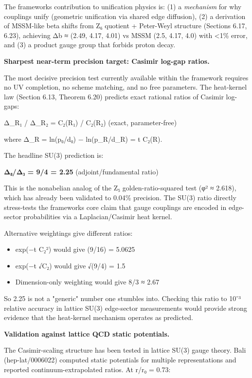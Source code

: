The framework\textquotesingle s contribution to unification physics is: (1) a \emph{mechanism} for why couplings unify (geometric unification via shared edge diffusion), (2) a derivation of MSSM-like beta shifts from Z₆ quotient + Peter-Weyl structure (Sections 6.17, 6.23), achieving Δb ≈ (2.49, 4.17, 4.01) vs MSSM (2.5, 4.17, 4.0) with \textless1\% error, and (3) a product gauge group that forbids proton decay.

\textbf{Sharpest near-term precision target: Casimir log-gap ratios.}

The most decisive precision test currently available within the framework requires no UV completion, no scheme matching, and no free parameters. The heat-kernel law (Section 6.13, Theorem 6.20) predicts exact rational ratios of Casimir log-gaps:

Δ\_R₁ / Δ\_R₂ = C₂(R₁) / C₂(R₂) (exact, parameter-free)

where Δ\_R = ln(p₀/d₀) − ln(p\_R/d\_R) = t C₂(R).

The headline SU(3) prediction is:

\textbf{Δ₈/Δ₃ = 9/4 = 2.25} (adjoint/fundamental ratio)

This is the nonabelian analog of the Z₅ golden-ratio-squared test (φ² ≈ 2.618), which has already been validated to 0.04\% precision. The SU(3) ratio directly stress-tests the framework\textquotesingle s core claim that gauge couplings are encoded in edge-sector probabilities via a Laplacian/Casimir heat kernel.

Alternative weightings give different ratios:

\begin{itemize}
\tightlist
\item
  exp(−t C₂²) would give (9/16) = 5.0625
\item
  exp(−t √C₂) would give √(9/4) = 1.5
\item
  Dimension-only weighting would give 8/3 ≈ 2.67
\end{itemize}

So 2.25 is not a "generic" number one stumbles into. Checking this ratio to 10⁻³ relative accuracy in lattice SU(3) edge-sector measurements would provide strong evidence that the heat-kernel mechanism operates as predicted.

\textbf{Validation against lattice QCD static potentials.}

The Casimir-scaling structure has been tested in lattice SU(3) gauge theory. Bali (hep-lat/0006022) computed static potentials for multiple representations and reported continuum-extrapolated ratios. At r/r₀ = 0.73:

